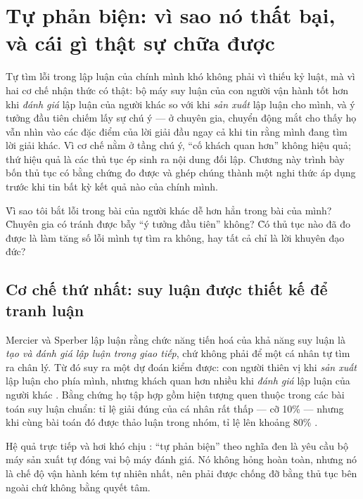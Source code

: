 \documentclass[../hieu-suat.tex]{subfiles}
\begin{document}
\chapter{Tự phản biện: vì sao nó thất bại, và cái gì thật sự chữa được}

\begin{tomtat}
Tự tìm lỗi trong lập luận của chính mình khó không phải vì thiếu kỷ luật, mà vì hai cơ chế nhận thức có thật: bộ máy suy luận của con người vận hành tốt hơn khi \emph{đánh giá} lập luận của người khác so với khi \emph{sản xuất} lập luận cho mình, và ý tưởng đầu tiên chiếm lấy sự chú ý --- ở chuyên gia, chuyển động mắt cho thấy họ vẫn nhìn vào các đặc điểm của lời giải đầu ngay cả khi tin rằng mình đang tìm lời giải khác. Vì cơ chế nằm ở tầng chú ý, ``cố khách quan hơn'' không hiệu quả; thứ hiệu quả là các thủ tục ép sinh ra nội dung đối lập. Chương này trình bày bốn thủ tục có bằng chứng đo được và ghép chúng thành một nghi thức áp dụng trước khi tin bất kỳ kết quả nào của chính mình.
\end{tomtat}

\begin{khoigoi}
\h{Vì sao tôi bắt lỗi trong bài của người khác dễ hơn hẳn trong bài của mình?}
\h{Chuyên gia có tránh được bẫy ``ý tưởng đầu tiên'' không?}
\h{Có thủ tục nào đã đo được là làm tăng số lỗi mình tự tìm ra không, hay tất cả chỉ là lời khuyên đạo đức?}
\end{khoigoi}

\section{Cơ chế thứ nhất: suy luận được thiết kế để tranh luận}

Mercier và Sperber \cite{mercier2011} lập luận rằng chức năng tiến hoá của khả năng suy luận là \emph{tạo và đánh giá lập luận trong giao tiếp}, chứ không phải để một cá nhân tự tìm ra chân lý. Từ đó suy ra một dự đoán kiểm được: con người thiên vị khi \emph{sản xuất} lập luận cho phía mình, nhưng khách quan hơn nhiều khi \emph{đánh giá} lập luận của người khác \nT{}. Bằng chứng họ tập hợp gồm hiện tượng quen thuộc trong các bài toán suy luận chuẩn: tỉ lệ giải đúng của cá nhân rất thấp --- cỡ 10\% --- nhưng khi cùng bài toán đó được thảo luận trong nhóm, tỉ lệ lên khoảng 80\% \nD{}.

Hệ quả trực tiếp và hơi khó chịu \nM{}: ``tự phản biện'' theo nghĩa đen là yêu cầu bộ máy sản xuất tự đóng vai bộ máy đánh giá. Nó không hỏng hoàn toàn, nhưng nó là chế độ vận hành kém tự nhiên nhất, nên phải được chống đỡ bằng thủ tục bên ngoài chứ không bằng quyết tâm.
\end{document}
